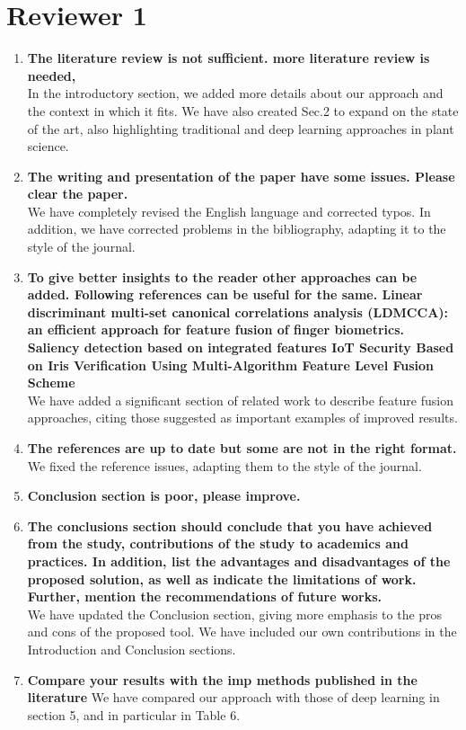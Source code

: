 \documentclass[]{article}
\begin{document}
	\section{Reviewer 1}
	\begin{enumerate}
	\item \textbf{The literature review is not sufficient. more literature review is needed,} \\
    In the introductory section, we added more details about our approach and the context in which it fits. We have also created Sec.2 to expand on the state of the art, also highlighting traditional and deep learning approaches in plant science.
    
    \item \textbf{The writing and presentation of the paper have some issues. Please clear the paper.} \\
	We have completely revised the English language and corrected typos. In addition, we have corrected problems in the bibliography, adapting it to the style of the journal.
	
	\item \textbf{To give better insights to the reader other approaches can be added. Following references can be useful for the same.
	Linear discriminant multi-set canonical correlations analysis (LDMCCA): an efficient approach for feature fusion of finger biometrics.
	Saliency detection based on integrated features
	IoT Security Based on Iris Verification Using Multi-Algorithm Feature Level Fusion Scheme} \\
	
	We have added a significant section of related work to describe feature fusion approaches, citing those suggested as important examples of improved results.

    \item \textbf{The references are up to date but some are not in the right format.} \\
    We fixed the reference issues, adapting them to the style of the journal.

    \item \textbf{Conclusion section is poor, please improve.} 
    \item \textbf{The conclusions section should conclude that you have achieved from the study, contributions of the study to academics and practices. In addition, list the advantages and disadvantages of the proposed solution, as well as indicate the limitations of work. Further, mention the recommendations of future works.} \\
    We have updated the Conclusion section, giving more emphasis to the pros and cons of the proposed tool. We have included our own contributions in the Introduction and Conclusion sections.
    
    \item \textbf{Compare your results with the imp methods published in the literature}
    We have compared our approach with those of deep learning in section 5, and in particular in Table 6.
    
	\end{enumerate}
	
\end{document}
